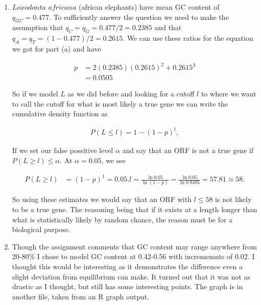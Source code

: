 \documentclass[12pt]{article}
\numberwithin{theorem}{subsection}
\theoremstyle{definition}
\numberwithin{definition}{subsection}
\numberwithin{corollary}{subsection}
\theoremstyle{remark}
\begin{document}
\begin{enumerate}[label=\textbf{\arabic*.}]
\begin{enumerate}[label = \textbf{\alph*.}]
            \item $Loxodonta$ $africana$ (african elephants) have mean GC content of $q_{GC} = 0.477$. To sufficiently answer the question we need to make the assumption that $q_{C} = q_{G} = 0.477/2 = 0.2385$ and that $q_{A} = q_{T} = (1-0.477)/2 = 0.2615$. We can use these ratios for the equation we got for part (a) and have 

            	\begin{align*}
                    p 	&= 2(0.2385)(0.2615)^2 + 0.2615^3 \\
                    	&= 0.0505
                \end{align*}

            So if we model $L$ as we did before and looking for a cutoff $l$ to where we want to call the cutoff for what is most likely a true gene we can write the cumulative density function as 

                \begin{align*}
                    P(L \leq l) = 1 - (1 - p)^l,
                \end{align*}
                
            If we set our false possitive level $\alpha$ and say that an ORF is not a true gene if $P(L \geq l) \leq \alpha$. At $\alpha = 0.05$, we see 

                \begin{align*}
                    P(L \geq l) &= (1 - p)^1 = 0.05.
                    l = \frac{\ln{0.05}}{\ln{(1 - p)}} = \frac{\ln{0.05}}{\ln{0.9495}} = 57.81 \approx 58.
                \end{align*}

            So using these estimates we would say that an ORF with $l \leq 58$ is not likely to be a true gene. The reasoning being that if it exists at a length longer than what is statistically likely by random chance, the reason must be for a biological purpose.
            
            
            \item Though the assignment comments that GC content may range anywhere from 20-80\% I chose to model GC content at 0.42-0.56 with incrememnts of 0.02. I thought this would be interesting as it demonstrates the difference even a slight deviation from equilibrium can make. It turned out that it was not as drastic as I thought, but still has some interesting points. The graph is in another file, taken from an R graph output.
        \end{enumerate}
        

\end{enumerate}
\end{document}
